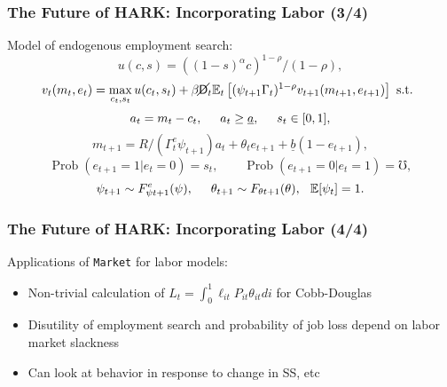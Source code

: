 \documentclass[11pt,handout]{beamer}
\newcommand{\Prob}{\operatorname{Prob}}
\newcommand{\E}{\mathbb{E}}
\newcommand{\bi}{\begin{itemize}}
\newcommand{\ei}{\end{itemize}}
\newcommand{\Die}{\mathsf{D}}
\newcommand{\Live}{\cancel{\Die}}
\begin{document}
\begin{frame}
\frametitle{The Future of HARK: Incorporating Labor (3/4)}
Model of endogenous employment search:
\begin{equation*}
u(c,s) = ((1-s)^\alpha c)^{1-\rho}/(1-\rho),
\end{equation*}
\begin{equation*}
v_t(m_t,e_t) = \max_{c_t,s_t} u(c_t,s_t) + \beta \Live_t \E_t \left[(\psi_{t+1} \Gamma_t)^{1-\rho} v_{t+1}(m_{t+1},e_{t+1}) \right] \text{ s.t. }
\end{equation*}
\begin{equation*}
a_t = m_t - c_t, \hspace{0.5cm} a_t \geq \underline{a}, \hspace{0.5cm} s_t \in [0,1],
\end{equation*}
\begin{equation*}
m_{t+1} = R/(\Gamma^e_t \psi_{t+1}) a_t + \theta_t e_{t+1} + \underline{b}(1-e_{t+1}), 
\end{equation*}
\begin{equation*}
\Prob(e_{t+1} = 1 | e_t = 0) = s_t, \qquad \Prob(e_{t+1} = 0 | e_t = 1) = \mho,
\end{equation*}
\begin{equation*}
\psi_{t+1} \sim F^e_{\psi t+1}(\psi), \hspace{0.5cm} \theta_{t+1} \sim F_{\theta t+1}(\theta), \hspace{0.25cm} \E[\psi_t] = 1.
\end{equation*}
\end{frame}



\begin{frame}
\frametitle{The Future of HARK: Incorporating Labor (4/4)}
Applications of \texttt{Market} for labor models:
\bi
\item Non-trivial calculation of $L_t = \int_0^1 \ell_{it} P_{it} \theta_{it} di$ for Cobb-Douglas

\item Disutility of employment search and probability of job loss depend on labor market slackness

\item Can look at behavior in response to change in SS, etc
\ei
\end{frame}
\end{document}
